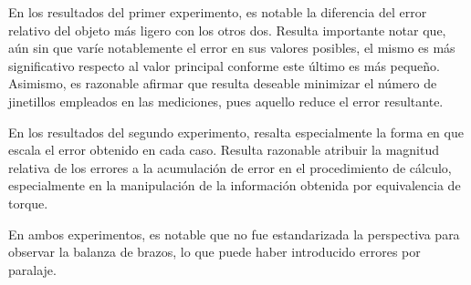 \documentclass[../main.tex]{subfiles}
\begin{document}
En los resultados del primer experimento, es notable la diferencia del error relativo del objeto más ligero con los otros dos. Resulta importante notar que, aún sin que varíe notablemente el error en sus valores posibles, el mismo es más significativo respecto al valor principal conforme este último es más pequeño. Asimismo, es razonable afirmar que resulta deseable minimizar el número de jinetillos empleados en las mediciones, pues aquello reduce el error resultante.

En los resultados del segundo experimento, resalta especialmente la forma en que escala el error obtenido en cada caso. Resulta razonable atribuir la magnitud relativa de los errores a la acumulación de error en el procedimiento de cálculo, especialmente en la manipulación de la información obtenida por equivalencia de torque.

En ambos experimentos, es notable que no fue estandarizada la perspectiva para observar la balanza de brazos, lo que puede haber introducido errores por paralaje.
\end{document}
